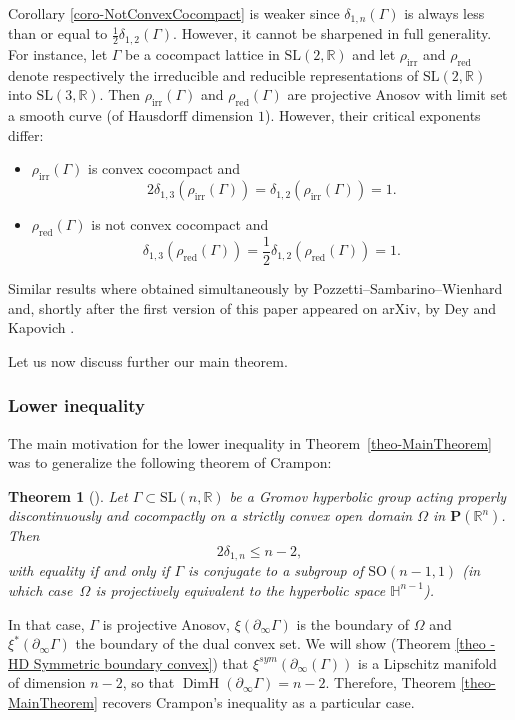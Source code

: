 \documentclass[11pt]{article}
\numberwithin{equation}{section}
\newcommand{\irr}{\mathrm{irr}}
\newcommand{\red}{\mathrm{red}}
\newtheorem{theo}{Theorem}[section]
\theoremstyle{definition}
\newcommand{\proj}{\mathbf{P}}
\newcommand{\R}{\mathbb{R}}
\newcommand{\Hyp}{\mathbb{H}}
\newcommand{\SL}{\mathrm{SL}}
\newcommand{\SO}{\mathrm{SO}}
\DeclareMathOperator{\DimH}{DimH}
\let\G\Gamma
\begin{document}
Corollary \ref{coro-NotConvexCocompact} is weaker since $\delta_{1,n}(\Gamma)$ is always less than or equal to $\frac{1}{2} \delta_{1,2}(\G)$. However, it cannot be sharpened in full generality. For instance, let $\Gamma$ be a cocompact lattice in $\SL(2,\R)$ and let $\rho_{\irr}$ and $\rho_{\red}$ denote respectively the irreducible and redu\-cible representations of $\SL(2,\R)$ into $\SL(3,\R)$. Then $\rho_{\irr}(\Gamma)$ and $\rho_{\red}(\Gamma)$ are projective Anosov with limit set a smooth curve (of Hausdorff dimension $1$). However, their critical exponents differ:
\begin{itemize}
\item $\rho_{\irr}(\Gamma)$ is convex cocompact and
\[2\delta_{1,3}(\rho_{\irr}(\G)) = \delta_{1,2}(\rho_{\irr}(\G)) = 1.\]
\item $\rho_{\red}(\Gamma)$ is not convex cocompact and
\[\delta_{1,3}(\rho_{\red}(\G)) = \frac{1}{2} \delta_{1,2}(\rho_{\red}(\G)) = 1.\]
\end{itemize}

Similar results where obtained simultaneously by Pozzetti--Sambarino--Wienhard \cite{PSW19} and, shortly after the first version of this paper appeared on arXiv, by Dey and Kapovich \cite{DeyKapovich}.

Let us now discuss further our main theorem.

\subsubsection*{Lower inequality}

The main motivation for the lower inequality in Theorem~\ref{theo-MainTheorem} was to generalize the following theorem of Crampon:

\begin{theo}[\cite{crampon2011dynamics}]
Let $\G \subset \SL(n,\R)$ be a Gromov hyperbolic group acting properly discontinuously and cocompactly on a strictly convex open domain $\Omega$ in $\proj(\R^n)$. Then
\[2\delta_{1,n} \leq n-2,\]
with equality if and only if $\Gamma$ is conjugate to a subgroup of $\SO(n-1,1)$ (in which case~$\Omega$ is projectively equivalent to the hyperbolic space $\Hyp^{n-1}$).
\end{theo}

In that case, $\Gamma$ is projective Anosov, $\xi(\partial_\infty \G)$ is the boundary of $\Omega$ and $\xi^*(\partial_\infty \G)$ the boundary of the dual convex set. We will show (Theorem \ref{theo - HD Symmetric boundary convex}) that $\xi^{\textit{sym}}(\partial_\infty(\G))$ is a Lipschitz manifold of dimension $n-2$, so that $\DimH(\partial_\infty \G) = n-2$. Therefore, Theorem \ref{theo-MainTheorem} recovers Crampon's inequality as a particular case.
\end{document}
